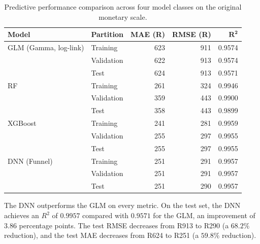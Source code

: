 \begin{table}[H]
\centering
\small
\renewcommand{\arraystretch}{1.15}
\begin{tabular}{llrrr}
\toprule
\textbf{Model} & \textbf{Partition} & \textbf{MAE (R)} &
\textbf{RMSE (R)} & $\boldsymbol{R^2}$ \\
\midrule
GLM (Gamma, log-link)
    & Training   & 623 & 911 & 0.9574 \\
    & Validation & 622 & 913 & 0.9574 \\
    & Test       & 624 & 913 & 0.9571 \\
\addlinespace
RF
    & Training   & 261 & 324 & 0.9946 \\
    & Validation & 359 & 443 & 0.9900 \\
    & Test       & 358 & 443 & 0.9899 \\
\addlinespace
XGBoost
    & Training   & 241 & 281 & 0.9959 \\
    & Validation & 255 & 297 & 0.9955 \\
    & Test       & 255 & 297 & 0.9955 \\
\addlinespace
DNN (Funnel)
    & Training   & 251 & 291 & 0.9957 \\
    & Validation & 251 & 291 & 0.9957 \\
    & Test       & 251 & 290 & 0.9957 \\
\bottomrule
\end{tabular}
\caption{Predictive performance comparison across four model classes on
the original monetary scale.}
\label{tab:four_model_comparison_ch4}
\end{table}

\noindent
The DNN outperforms the GLM on every metric.  On the test
set, the DNN achieves an $R^2$ of $0.9957$ compared with
$0.9571$ for the GLM, an improvement of $3.86$ percentage points.
The test RMSE decreases from R913 to R290 (a $68.2\%$ reduction),
and the test MAE decreases from R624 to R251 (a $59.8\%$
reduction).

